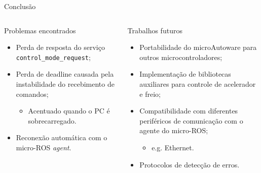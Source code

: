 \documentclass{if-beamer}
\begin{document}
\begin{frame}{Conclusão}
	
	\begin{columns}
		
		\begin{column}{0.435\textwidth}
			
			\begin{block}{Problemas encontrados}
				
				\begin{itemize}
					\item Perda de resposta do serviço \texttt{control\_mode\_request};	
					\pause
					\item Perda de deadline causada pela instabilidade do recebimento de comandos;	
					\pause
					\begin{itemize}
						\item Acentuado quando o PC é sobrecarregado.
					\end{itemize}	
					\pause
					\item Reconexão automática com o micro-ROS \textit{agent}.
				\end{itemize}
				
			\end{block}
			
		\end{column}
	
\pause
		
		\begin{column}{0.435\textwidth}
			
			\begin{block}{Trabalhos futuros}
				
				\begin{itemize}
					\item Portabilidade do microAutoware para outros microcontroladores;	
					\pause
					\item Implementação de bibliotecas auxiliares para controle de acelerador e freio;	
					\pause
					\item Compatibilidade com diferentes periféricos de comunicação com o agente do micro-ROS;
					\begin{itemize}
						\item e.g. Ethernet.						
					\end{itemize}	
					\pause
					\item Protocolos de detecção de erros.
				\end{itemize}
				
			\end{block}
			

\end{column}
\end{columns}
\end{frame}
\end{document}
